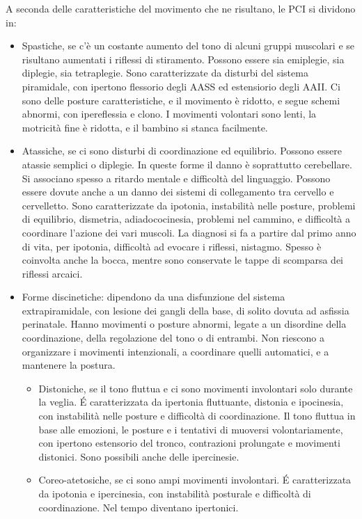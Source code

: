 A seconda delle caratteristiche del movimento che ne risultano, le PCI si dividono in:
\begin{itemize}
\item Spastiche, se c'è un costante aumento del tono di alcuni gruppi muscolari e se risultano aumentati i riflessi di stiramento.
Possono essere sia emiplegie, sia diplegie, sia tetraplegie. Sono caratterizzate da disturbi del sistema piramidale, con ipertono
flessorio degli AASS ed estensiorio degli AAII. Ci sono delle posture caratteristiche, e il movimento è ridotto, e segue schemi abnormi,
con ipereflessia e clono. I movimenti volontari sono lenti, la motricità fine è ridotta, e il bambino si stanca facilmente.
\item Atassiche, se ci sono disturbi di coordinazione ed equilibrio. Possono essere atassie semplici o diplegie. In queste forme il
danno è soprattutto cerebellare. Si associano spesso a ritardo mentale e difficoltà del linguaggio. Possono essere dovute anche a un
danno dei sistemi di collegamento tra cervello e cervelletto. Sono caratterizzate da ipotonia, instabilità nelle posture, problemi di
equilibrio, dismetria, adiadococinesia, problemi nel cammino, e difficoltà a coordinare l'azione dei vari muscoli. La diagnosi si fa a
partire dal primo anno di vita, per ipotonia, difficoltà ad evocare i riflessi, nistagmo. Spesso è coinvolta anche la bocca, mentre sono
conservate le tappe di scomparsa dei riflessi arcaici. 
\item Forme discinetiche: dipendono da una disfunzione del sistema extrapiramidale, con lesione dei gangli della base, di solito dovuta
ad asfissia perinatale. Hanno movimenti o posture abnormi, legate a un disordine della coordinazione, della regolazione del tono o di
entrambi. Non riescono a organizzare i movimenti intenzionali, a coordinare quelli automatici, e a mantenere la postura. 
\begin{itemize}
\item Distoniche, se il tono fluttua e ci sono movimenti involontari solo durante la veglia. \'E caratterizzata da ipertonia fluttuante,
distonia e ipocinesia, con instabilità nelle posture e difficoltà di coordinazione. Il tono fluttua in base alle emozioni, le posture e
i tentativi di muoversi volontariamente, con ipertono estensorio del tronco, contrazioni prolungate e movimenti distonici. Sono
possibili anche delle ipercinesie. 
\item Coreo-atetosiche, se ci sono ampi movimenti involontari. \'E caratterizzata da ipotonia e ipercinesia, con instabilità posturale e
difficoltà di coordinazione. Nel tempo diventano ipertonici. 
\end{itemize}
\end{itemize}


